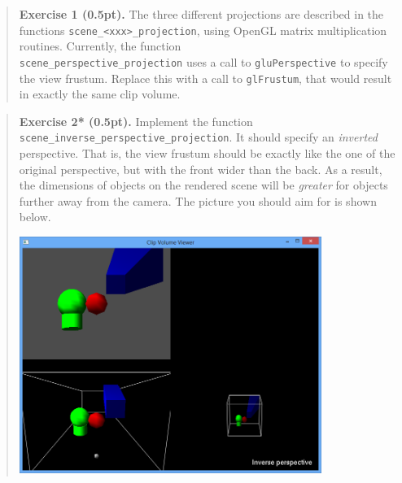 \documentclass{article}
\newenvironment{exercise}[2]{\begin{verse}\textbf{Exercise #1 (#2pt).} }{
\end{verse}\medskip}
\begin{document}
\begin{exercise}{1}{0.5}
The three different projections are described in the functions \verb#scene_<xxx>_projection#, using OpenGL matrix multiplication routines. Currently, the function \\
\noindent
\verb#scene_perspective_projection# uses a call to \verb#gluPerspective# to specify the view frustum. Replace this with a call to \verb#glFrustum#, that would result in exactly the same clip volume.
\end{exercise}

\begin{exercise}{2*}{0.5}
Implement the function \\
\noindent \verb#scene_inverse_perspective_projection#. It should specify an \emph{inverted} perspective. That is, the view frustum should be exactly like the one of the original perspective, but with the front wider than the back. As a result, the dimensions of objects on the rendered scene will be \emph{greater} for objects further away from the camera. The picture you should aim for is shown below.
\begin{center}
\includegraphics[width=0.8\textwidth]{inverseperspective.png}
\end{center}
\end{exercise}
\end{document}
